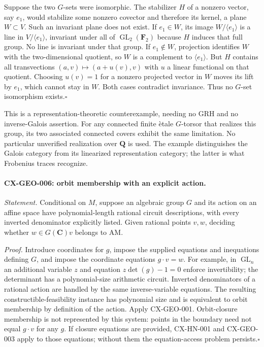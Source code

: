 \documentclass[11pt,a4paper]{article}
\begin{document}
Suppose the two $G$-sets were isomorphic. The stabilizer $H$ of a nonzero
vector, say $e_1$, would stabilize some nonzero covector and therefore its
kernel, a plane $W\subset V$. Such an invariant plane does not exist.
If $e_1\in W$, its image $W/\langle e_1\rangle$ is a line in
$V/\langle e_1\rangle$, invariant under all of
$\operatorname{GL}_2(\mathbf F_2)$ because $H$ induces that full group.
No line is invariant under that group. If $e_1\notin W$, projection identifies
$W$ with the two-dimensional quotient, so $W$ is a complement to
$\langle e_1\rangle$. But $H$ contains all transvections
$(a,v)\mapsto(a+u(v),v)$ with $u$ a linear functional on that quotient.
Choosing $u(v)=1$ for a nonzero projected vector in $W$ moves its lift by
$e_1$, which cannot stay in $W$. Both cases contradict invariance.
Thus no $G$-set isomorphism exists.\hfill$\square$

This is a representation-theoretic counterexample, needing no GRH and no
inverse-Galois assertion. For any connected finite \`etale $G$-torsor that
realizes this group, its two associated connected covers exhibit the same
limitation. No particular unverified realization over $\mathbf Q$ is used.
The example distinguishes the Galois category from its linearized
representation category; the latter is what Frobenius traces recognize.

\paragraph{CX-GEO-006: orbit membership with an explicit action.}
\emph{Statement.} Conditional on $M$, suppose an algebraic group $G$ and its
action on an affine space have polynomial-length rational circuit descriptions,
with every inverted denominator explicitly listed. Given rational points
$v,w$, deciding whether $w\in G(\mathbf C)v$ belongs to $\mathrm{AM}$.

\emph{Proof.} Introduce coordinates for $g$, impose the supplied equations
and inequations defining $G$, and impose the coordinate equations
$g\cdot v=w$. For example, in $\operatorname{GL}_n$ an additional variable
$z$ and equation $z\det(g)-1=0$ enforce invertibility; the determinant has
a polynomial-size arithmetic circuit. Inverted denominators of a rational
action are handled by the same inverse-variable equations. The resulting
constructible-feasibility instance has polynomial size and is equivalent to
orbit membership by definition of the action. Apply CX-GEO-001.
Orbit-closure membership is not represented by this system: points in the
boundary need not equal $g\cdot v$ for any $g$. If closure equations are
provided, CX-HN-001 and CX-GEO-003 apply to those equations; without them
the equation-access problem persists.\hfill$\square$
\end{document}
